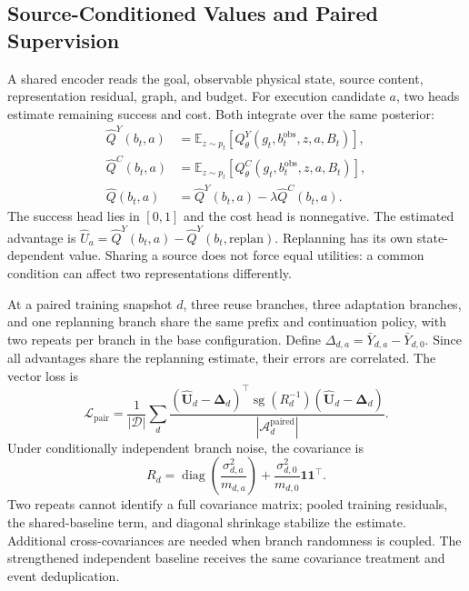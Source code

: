\documentclass[sigconf,anonymous,review]{acmart}
\DeclareMathOperator{\sg}{sg}
\DeclareMathOperator{\diag}{diag}
\newcommand{\E}{\mathbb{E}}
\theoremstyle{zhplain}
\begin{document}
\subsection{Source-Conditioned Values and Paired Supervision}
A shared encoder reads the goal, observable physical state, source content, representation residual, graph, and budget. For execution candidate \(a\), two heads estimate remaining success and cost. Both integrate over the same posterior:
\begin{equation}
\begin{aligned}
\hat Q^Y(b_t,a)&=\E_{z\sim p_t}[Q_\theta^Y(g_t,b_t^{\mathrm{obs}},z,a,B_t)],\\
\hat Q^C(b_t,a)&=\E_{z\sim p_t}[Q_\theta^C(g_t,b_t^{\mathrm{obs}},z,a,B_t)],\\
\hat Q(b_t,a)&=\hat Q^Y(b_t,a)-\lambda\hat Q^C(b_t,a).
\end{aligned}
\label{eq:values}
\end{equation}
The success head lies in \([0,1]\) and the cost head is nonnegative. The estimated advantage is \(\hat U_a=\hat Q^Y(b_t,a)-\hat Q^Y(b_t,\mathrm{replan})\). Replanning has its own state-dependent value. Sharing a source does not force equal utilities: a common condition can affect two representations differently.

At a paired training snapshot \(d\), three reuse branches, three adaptation branches, and one replanning branch share the same prefix and continuation policy, with two repeats per branch in the base configuration. Define \(\Delta_{d,a}=\bar Y_{d,a}-\bar Y_{d,0}\). Since all advantages share the replanning estimate, their errors are correlated. The vector loss is
\begin{equation}
\mathcal L_{\mathrm{pair}}=\frac1{|\mathcal D|}\sum_d
\frac{(\hat{\boldsymbol U}_d-\boldsymbol\Delta_d)^\top
\sg(R_d^{-1})(\hat{\boldsymbol U}_d-\boldsymbol\Delta_d)}{|\mathcal A_d^{\mathrm{paired}}|}.
\label{eq:pair}
\end{equation}
Under conditionally independent branch noise, the covariance is
\begin{equation}
R_d=\diag\!\left(\frac{\sigma_{d,a}^2}{m_{d,a}}\right)+\frac{\sigma_{d,0}^2}{m_{d,0}}\boldsymbol1\boldsymbol1^\top.
\end{equation}
Two repeats cannot identify a full covariance matrix; pooled training residuals, the shared-baseline term, and diagonal shrinkage stabilize the estimate. Additional cross-covariances are needed when branch randomness is coupled. The strengthened independent baseline receives the same covariance treatment and event deduplication.
\end{document}
